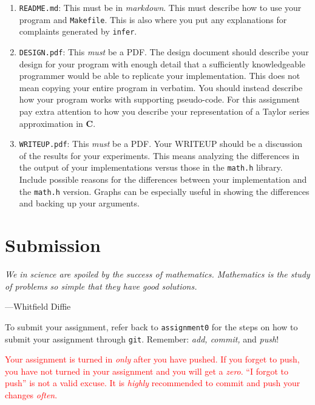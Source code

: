 \documentclass[11pt]{article}
\begin{document}
\begin{enumerate}
  \item \texttt{README.md}: This must be in \emph{markdown}. This
      must describe how to use your program and \texttt{Makefile}. This is also
      where you put any explanations for complaints generated by \texttt{infer}.

  \item \texttt{DESIGN.pdf}: This \emph{must} be a PDF. The design document
  should describe your design for your program with enough detail
  that a sufficiently knowledgeable programmer would be able to
  replicate your implementation. This does not mean copying your
  entire program in verbatim. You should instead describe how your
  program works with supporting pseudo-code. For this assignment pay extra attention to how you describe your representation
        of a Taylor series approximation in \textbf{C}.

  \item \texttt{WRITEUP.pdf}: This \emph{must} be a PDF. Your WRITEUP should be a discussion of the results for your
  experiments. This means analyzing the differences in the output of
  your implementations versus those in the \texttt{math.h} library.
  Include possible reasons for the differences between your implementation
  and the \texttt{math.h} version. Graphs can be especially useful
  in showing the differences and backing up your arguments.

\end{enumerate}



\section{Submission}
\epigraph{\emph{We in science are spoiled by the success of mathematics.
Mathematics is the study of problems so simple that they have good
solutions.}}{---Whitfield Diffie}

To submit your assignment, refer back to \texttt{assignment0} for the steps on how to submit your assignment through \texttt{git}. Remember: \emph{add, commit,} and \emph{push}!

\textcolor{red}{Your assignment is turned in \emph{only} after you have pushed.
If you forget to push, you have not turned in your assignment and you will get
a \emph{zero}. ``I forgot to push'' is not a valid excuse. It is \emph{highly} recommended to commit and push your changes \emph{often}.}
\end{document}
